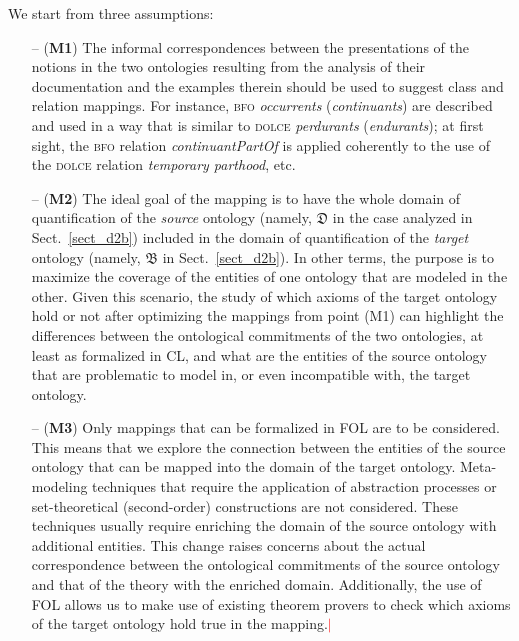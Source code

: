 \documentclass[ao]{iosart2x}
\newcommand{\nb}[1]{\textcolor{red}{$|$}\marginpar{\hspace*{-0cm}\parbox{20mm}{\scriptsize\raggedright\textcolor{red}{#1}}}}
\newcommand{\dolce}{{\textsc{dolce}}}
\newcommand{\bfo}{{\textsc{bfo}}}
\newcommand {\thdolce} {\ensuremath{\mathfrak{D}}}
\newcommand {\thbfo} {\ensuremath{\mathfrak{B}}}
\begin{document}
We start from three assumptions:
%
\begin{itemize}
\item[--] ({\bf M1}) The informal correspondences between the presentations of the notions in the two ontologies resulting from the analysis of their documentation and the examples therein should be used to suggest class and relation mappings. 
For instance, {\bfo} \emph{occurrents} (\emph{continuants}) are described and used in a way that is similar to {\dolce} \emph{perdurants} (\emph{endurants}); at first sight, the {\bfo} relation \emph{continuantPartOf} is applied coherently to the use of the {\dolce} relation \emph{temporary parthood}, etc. 


\item[--] ({\bf M2}) The ideal goal of the mapping is to have the whole domain of quantification of the \emph{source} ontology (namely, {$\thdolce$} in the case analyzed in Sect.~\ref{sect_d2b}) included in the domain of quantification of the \emph{target} ontology (namely, {$\thbfo$} in Sect.~\ref{sect_d2b}). In other terms, the purpose is to maximize the coverage of the entities of one ontology that are modeled in the other. 
Given this scenario, the study of which axioms of the target ontology hold or not after optimizing the mappings from point (M1) can highlight the differences between the ontological commitments of the two ontologies, at least as formalized in CL, and what are the entities of the source ontology that are problematic to model in, or even incompatible with, the target ontology.   

\item[--] ({\bf M3}) Only mappings that can be formalized in FOL are to be considered. This means that we explore the connection between the entities of the source ontology that can be mapped into the domain of the target ontology. Meta-modeling techniques that require the application of abstraction processes or set-theoretical (second-order) constructions are not considered. These techniques usually require enriching the domain of the source ontology with additional entities. This change raises concerns about the actual correspondence between the ontological commitments of the source ontology and that of the theory with the enriched domain. Additionally, the use of FOL allows us to make use of existing theorem provers to check which axioms of the target ontology hold true in the mapping.\nb{CM: questo ultimo commento non mi convince, abbiamo cercato di restare a FOL perché: (1) possiamo sperare di farci aiutare dai TPs; (2) sfruttiamo l'idea classica di definitional extension (invece che passare a teoremi di rappresentazione che comunque avrebbero senso) [FC: non so seguirti sul punto (2) (teoremi di rappresentazione = ?, in questo contesto), né su M3 originale. PEr punto (1) ho messo frase sui TP]} 
\end{itemize}
\end{document}
